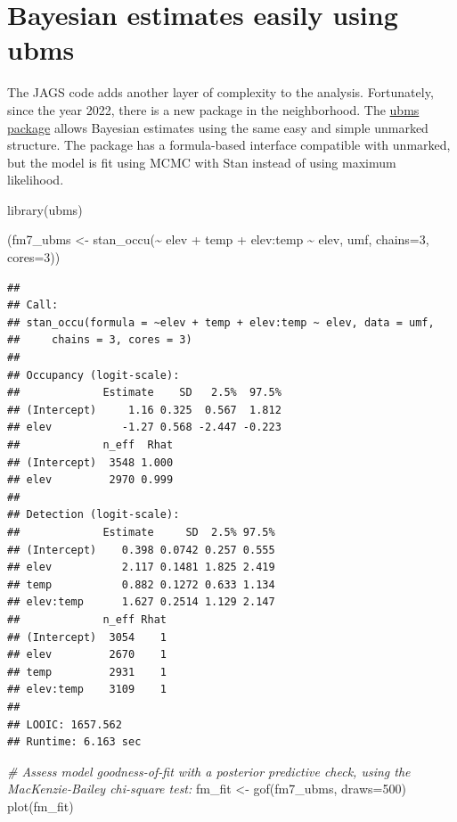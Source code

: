 \documentclass[
]{book}
\newenvironment{Shaded}{\begin{snugshade}}{\end{snugshade}}
\newcommand{\AttributeTok}[1]{\textcolor[rgb]{0.77,0.63,0.00}{#1}}
\newcommand{\CommentTok}[1]{\textcolor[rgb]{0.56,0.35,0.01}{\textit{#1}}}
\newcommand{\DecValTok}[1]{\textcolor[rgb]{0.00,0.00,0.81}{#1}}
\newcommand{\FunctionTok}[1]{\textcolor[rgb]{0.00,0.00,0.00}{#1}}
\newcommand{\NormalTok}[1]{#1}
\newcommand{\OtherTok}[1]{\textcolor[rgb]{0.56,0.35,0.01}{#1}}
\newcommand{\SpecialCharTok}[1]{\textcolor[rgb]{0.00,0.00,0.00}{#1}}
\begin{document}
\hypertarget{bayesian-estimates-easily-using-ubms}{%
\section{Bayesian estimates easily using ubms}\label{bayesian-estimates-easily-using-ubms}}

The JAGS code adds another layer of complexity to the analysis. Fortunately, since the year 2022, there is a new package in the neighborhood. The \href{https://kenkellner.com/ubms/}{ubms package} allows Bayesian estimates using the same easy and simple unmarked structure. The package has a formula-based interface compatible with unmarked, but the model is fit using MCMC with Stan instead of using maximum likelihood.

\begin{Shaded}
\begin{Highlighting}[]
\FunctionTok{library}\NormalTok{(ubms)}

\NormalTok{(fm7\_ubms }\OtherTok{\textless{}{-}} \FunctionTok{stan\_occu}\NormalTok{(}\SpecialCharTok{\textasciitilde{}}\NormalTok{ elev }\SpecialCharTok{+}\NormalTok{ temp }\SpecialCharTok{+}\NormalTok{ elev}\SpecialCharTok{:}\NormalTok{temp }\SpecialCharTok{\textasciitilde{}}\NormalTok{ elev, umf, }\AttributeTok{chains=}\DecValTok{3}\NormalTok{, }\AttributeTok{cores=}\DecValTok{3}\NormalTok{))}
\end{Highlighting}
\end{Shaded}

\begin{verbatim}
## 
## Call:
## stan_occu(formula = ~elev + temp + elev:temp ~ elev, data = umf, 
##     chains = 3, cores = 3)
## 
## Occupancy (logit-scale):
##             Estimate    SD   2.5%  97.5%
## (Intercept)     1.16 0.325  0.567  1.812
## elev           -1.27 0.568 -2.447 -0.223
##             n_eff  Rhat
## (Intercept)  3548 1.000
## elev         2970 0.999
## 
## Detection (logit-scale):
##             Estimate     SD  2.5% 97.5%
## (Intercept)    0.398 0.0742 0.257 0.555
## elev           2.117 0.1481 1.825 2.419
## temp           0.882 0.1272 0.633 1.134
## elev:temp      1.627 0.2514 1.129 2.147
##             n_eff Rhat
## (Intercept)  3054    1
## elev         2670    1
## temp         2931    1
## elev:temp    3109    1
## 
## LOOIC: 1657.562
## Runtime: 6.163 sec
\end{verbatim}

\begin{Shaded}
\begin{Highlighting}[]
\CommentTok{\# Assess model goodness{-}of{-}fit with a posterior predictive check, using the MacKenzie{-}Bailey chi{-}square test:}
\NormalTok{fm\_fit }\OtherTok{\textless{}{-}} \FunctionTok{gof}\NormalTok{(fm7\_ubms, }\AttributeTok{draws=}\DecValTok{500}\NormalTok{)}
\FunctionTok{plot}\NormalTok{(fm\_fit)}
\end{Highlighting}
\end{Shaded}
\end{document}
